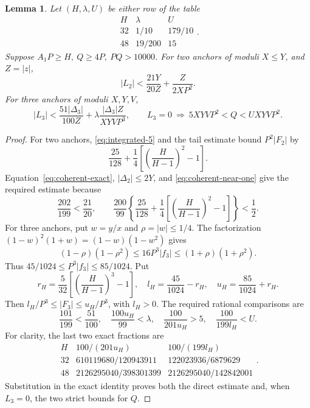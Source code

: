 \documentclass[12pt]{article}
\newtheorem{lemma}[theorem]{Lemma}
\numberwithin{equation}{section}
\begin{document}
\begin{lemma}\label{lem:interpolation-parameters}
Let \((H,\lambda,U)\) be either row of the table
\[
 \begin{array}{c|c|c}
 H&\lambda&U\\\hline
 32&1/10&179/10\\
 48&19/200&15
 \end{array}.
\]
Suppose \(A_1P\ge H,\ Q\ge4P,\ PQ>10000\). For two anchors
of moduli \(X\le Y\), and \(Z=|z|\),
\[
 |L_2|<\frac{21Y}{20Z}+\frac{Z}{2XP^2}.
\]
For three anchors of moduli \(X,Y,V\),
\[
 |L_3|<
 \frac{51|\Delta_3|}{100Z}
 +\lambda\frac{|\Delta_3|Z}{XYV P^3},\qquad
 L_3=0\ \Longrightarrow\
 5XYVP^2<Q<UXYVP^2.
\]
\end{lemma}
\begin{proof}
For two anchors, \eqref{eq:integrated-5} and the tail estimate bound \(P^2|F_2|\) by
\[
 \frac{25}{128}+\frac14\left[\left(\frac{H}{H-1}\right)^2-1\right].
\]
Equation~\eqref{eq:coherent-exact}, \(|\Delta_2|\le2Y\), and
\eqref{eq:coherent-near-one} give the required estimate because
\[
 \frac{202}{199}<\frac{21}{20},\qquad
 \frac{200}{99}\left\{\frac{25}{128}
 +\frac14\left[\left(\frac{H}{H-1}\right)^2-1\right]\right\}<\frac12.
\]
For three anchors, put $w=y/x$ and $\rho=|w|\le1/4$.
The factorization $(1-w)^2(1+w)=(1-w)(1-w^2)$ gives
\[
 (1-\rho)(1-\rho^2)\le16P^3|f_3|
 \le(1+\rho)(1+\rho^2).
\]
Thus $45/1024\le P^3|f_3|\le85/1024$. Put
\[
 r_H=\frac5{32}\left[\left(\frac{H}{H-1}\right)^3-1\right],
 \quad l_H=\frac{45}{1024}-r_H,\quad
 u_H=\frac{85}{1024}+r_H.
\]
Then \(l_H/P^3\le|F_3|\le u_H/P^3\), with \(l_H>0\).
The required rational comparisons are
\[
 \frac{101}{199}<\frac{51}{100},\quad
 \frac{100u_H}{99}<\lambda,\quad
 \frac{100}{201u_H}>5,\quad
 \frac{100}{199l_H}<U.
\]
For clarity, the last two exact fractions are
\[
 \begin{array}{c|cc}
 H&100/(201u_H)&100/(199l_H)\\\hline
 32&610119680/120943911&122023936/6879629\\
 48&2126295040/398301399&2126295040/142842001
 \end{array}.
\]
Substitution in the exact identity proves both the direct estimate and,
when \(L_3=0\), the two strict bounds for \(Q\).
\end{proof}
\end{document}
